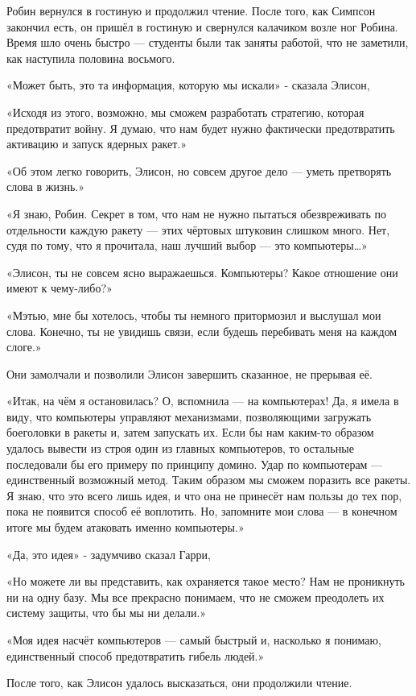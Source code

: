 \documentclass[a5paper, 9pt,
final, openany, twoside=true]{memoir}
\begin{document}
Робин вернулся в гостиную и продолжил чтение. После того, как Симпсон закончил есть, он пришёл в гостиную и свернулся калачиком возле ног Робина. Время шло очень быстро — студенты были так заняты работой, что не заметили, как наступила половина восьмого.

«Может быть, это та информация, которую мы искали» - сказала Элисон,

«Исходя из этого, возможно, мы сможем разработать стратегию, которая предотвратит войну. Я думаю, что нам будет нужно фактически предотвратить активацию и запуск ядерных ракет.»

«Об этом легко говорить, Элисон, но совсем другое дело — уметь претворять слова в жизнь.»

«Я знаю, Робин. Секрет в том, что нам не нужно пытаться обезвреживать по отдельности каждую ракету — этих чёртовых штуковин слишком много. Нет, судя по тому, что я прочитала, наш лучший выбор — это компьютеры…»

«Элисон, ты не совсем ясно выражаешься. Компьютеры? Какое отношение они имеют к чему-либо?»

«Мэтью, мне бы хотелось, чтобы ты немного притормозил и выслушал мои слова. Конечно, ты не увидишь связи, если будешь перебивать меня на каждом слоге.»

Они замолчали и позволили Элисон завершить сказанное, не прерывая её.

«Итак, на чём я остановилась? О, вспомнила — на компьютерах! Да, я имела в виду, что компьютеры управляют механизмами, позволяющими загружать боеголовки в ракеты и, затем запускать их. Если бы нам каким-то образом удалось вывести из строя один из главных компьютеров, то остальные последовали бы его примеру по принципу домино. Удар по компьютерам — единственный возможный метод. Таким образом мы сможем поразить все ракеты. Я знаю, что это всего лишь идея, и что она не принесёт нам пользы до тех пор, пока не появится способ её воплотить. Но, запомните мои слова — в конечном итоге мы будем атаковать именно компьютеры.»

«Да, это идея» - задумчиво сказал Гарри,

«Но можете ли вы представить, как охраняется такое место? Нам не проникнуть ни на одну базу. Мы все прекрасно понимаем, что не сможем преодолеть их систему защиты, что бы мы ни делали.»

«Моя идея насчёт компьютеров — самый быстрый и, насколько я понимаю, единственный способ предотвратить гибель людей.»

После того, как Элисон удалось высказаться, они продолжили чтение.
\end{document}
